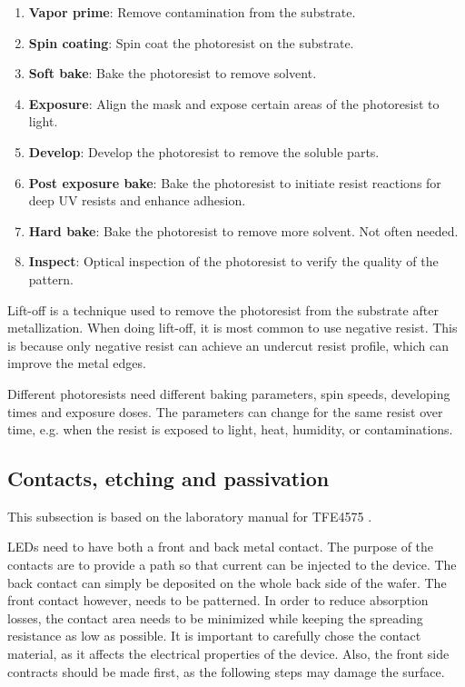 
\begin{enumerate}
    \item \textbf{Vapor prime}: Remove contamination from the substrate.
    \item \textbf{Spin coating}: Spin coat the photoresist on the substrate.
    \item \textbf{Soft bake}: Bake the photoresist to remove solvent.
    \item \textbf{Exposure}: Align the mask and expose certain areas of the photoresist to light.
    \item \textbf{Develop}: Develop the photoresist to remove the soluble parts.
    \item \textbf{Post exposure bake}: Bake the photoresist to initiate resist reactions for deep UV resists and enhance adhesion. 
    \item \textbf{Hard bake}: Bake the photoresist to remove more solvent. Not often needed.
    \item \textbf{Inspect}: Optical inspection of the photoresist to verify the quality of the pattern.
\end{enumerate} 

Lift-off is a technique used to remove the photoresist from the substrate after metallization.
When doing lift-off, it is most common to use negative resist. 
This is because only negative resist can achieve an undercut resist profile, which can improve the metal edges.

Different photoresists need different baking parameters, spin speeds, developing times and exposure doses.
The parameters can change for the same resist over time, e.g. when the resist is exposed to light, heat, humidity, or contaminations.

\subsection{Contacts, etching and passivation} \label{contactformation}

\noindent This subsection is based on the laboratory manual for TFE4575 \cite{labmanual}.

LEDs need to have both a front and back metal contact.
The purpose of the contacts are to provide a path so that current can be injected to the device. 
The back contact can simply be deposited on the whole back side of the wafer.
The front contact however, needs to be patterned.
In order to reduce absorption losses, the contact area needs to be minimized while keeping the spreading resistance as low as possible.
It is important to carefully chose the contact material, as it affects the electrical properties of the device.
Also, the front side contracts should be made first, as the following steps may damage the surface.


